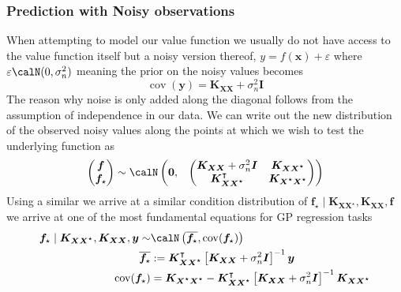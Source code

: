 \subsubsection{Prediction with Noisy observations}\label{Section1.1.2}
When attempting to model our value function we usually do not have access to the value function itself but a noisy version thereof, $y = f(\bm{x}) + \varepsilon$ where $\varepsilon \calN (0, \sigma_n^2)$ meaning the prior on the noisy values becomes
\[
    \operatorname{cov} (\bm{y}) = \bm{K_{XX}} + \sigma_n^2 \bm{I}
\]
The reason why noise is only added along the diagonal follows from the assumption of independence in our data.
We can write out the new distribution of the observed noisy values along the points at which we wish to test the underlying function as
\[
    \begin{pmatrix}
        \bm{f} \\
        \bm{f}_{\star}
    \end{pmatrix}
    \sim \calN
    \begin{pmatrix}
        \bm{0}, &
        {
                \begin{pmatrix}
                    \bm{K_{XX}} + \sigma_n^2 \bm{I} & \bm{K_{XX^{\star}}}         \\
                    \bm{K_{XX^{\star}}}^{\intercal} & \bm{K_{X^{\star}X^{\star}}}
                \end{pmatrix}
            }
    \end{pmatrix}
\]
Using a similar we arrive at a similar condition distribution of $\bm{f}_{\star} \mid \bm{K_{XX^{\star}}} , \bm{K_{XX}}, \bm{f}$ we arrive at one of the most fundamental equations for GP regression tasks
\begin{align*}\label{prop:GP_train_distr2}
    \bm{f}_{\star} \mid \bm{K_{XX^{\star}}} , \bm{K_{XX}}, \bm{y} \sim & \calN \left( \overline{\bm{f}_{\star}}, \operatorname{cov} (\bm{f}_{\star}) \right)                                                     \\
    \overline{\bm{f}_{\star}}                                          & := \bm{K_{XX^{\star}}}^{\intercal} \left[ \bm{K_{XX}} + \sigma_n^2 \bm{I} \right]^{-1} \bm{y}                                           \\
    \operatorname{cov} (\bm{f}_{\star})                                & = \bm{K_{X^{\star}X^{\star}}} - \bm{K_{XX^{\star}}}^{\intercal} \left[ \bm{K_{XX}} + \sigma_n^2 \bm{I} \right]^{-1} \bm{K_{XX^{\star}}}
\end{align*}